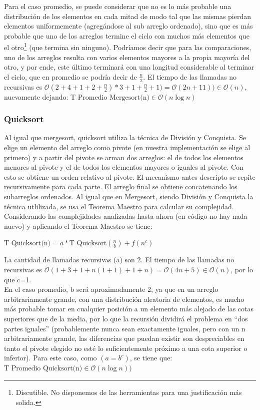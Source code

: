 \documentclass[article,a4paper]{article}
\newcommand{\bigO}{\mathcal{O}}
\begin{document}
Para el caso promedio, se puede considerar que no es lo más probable una distribución de los elementos en cada mitad de modo tal que las mismas pierdan elementos uniformemente (agregándose al sub arreglo ordenado), sino que es más probable que uno de los arreglos termine el ciclo con muchos más elementos que el otro\footnote{Discutible. No disponemos de las herramientas para una justificación más solida.} (que termina sin ninguno). Podríamos decir que para las comparaciones, uno de los arreglos resulta con varios elementos mayores a la propia mayoría del otro, y por ende, este último terminará con una longitud considerable al terminar el ciclo, que en promedio se podría decir de $\frac{n}{2}$. El tiempo de las llamadas no recursivas es $\bigO(2 + 4 + 1 + 2 + \frac{n}{2}) * 3 + 1 + \frac{n}{2} + 1) = \bigO(2n + 11)) \in \bigO(n)$, nuevamente dejando: $\mbox{T Promedio Mergesort(n)} \in \bigO(n \log n)$

\subsubsection{Quicksort}

Al igual que mergesort, quicksort utiliza la técnica de División y Conquista. Se elige un elemento del arreglo como pivote (en nuestra implementación se elige al primero) y a partir del pivote se arman dos arreglos: el de todos los elementos menores al pivote y el de todos los elementos mayores o iguales al pivote. Con esto se obtiene un orden relativo al pivote. El mecanismo antes descripto se repite recursivamente para cada parte. El arreglo final se obtiene concatenando los subarreglos ordenados. Al igual que en Mergesort, siendo División y Conquista la técnica utlilizada, se usa el Teorema Maestro para calcular su complejidad.\\

Considerando las complejidades analizadas hasta ahora (en código no hay nada nuevo) y aplicando el Teorema Maestro se tiene:

$\mbox{T Quicksort(n)} = a * \mbox{T Quicksort}(\frac{n}{b}) + f(n^c)$

La cantidad de llamadas recursivas (a) son 2. El tiempo de las llamadas no recursivas es $\bigO(1 + 3 + 1 + n (1 + 1) + 1 + n) = \bigO(4n + 5) \in \bigO(n)$, por lo que c=1.\\

En el caso promedio, b será aproximadamente 2, ya que en un arreglo arbitrariamente grande, con una distribución aleatoria de elementos, es mucho más probable tomar en cualquier posición a un elemento más alejado de las cotas superiores que de la media, por lo que la recursión dividirá el problema en “dos partes iguales” (probablemente nunca sean exactamente iguales, pero con un n arbitrariamente grande, las diferencias que puedan existir son despreciables en tanto el pivote elegido no esté lo suficientemente próximo a una cota superior o inferior). Para este caso, como $(a = b^c)$, se tiene que: $\mbox{T Promedio Quicksort(n)} \in \bigO(n \log n))$
\end{document}
